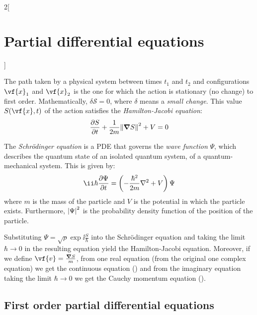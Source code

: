 \documentclass[../../../main_math.tex]{subfiles}
\begin{document}
\begin{multicols}{2}[\section{Partial differential equations}]
  \begin{proposition}
    The path taken by a physical system between times $t_1$ and $t_2$ and configurations $\vf{x}_1$ and $\vf{x}_2$ is the one for which the action is stationary (no change) to first order. Mathematically, $\delta \mathcal{S}=0$, where $\delta$ means a \emph{small change}. This value $S(\vf{x},t)$ of the action satisfies the \emph{Hamilton-Jacobi equation}: $$\pdv{S}{t}+\frac{1}{2m}{\norm{\grad S}}^2+V=0$$
  \end{proposition}
  \begin{proposition}
    The \emph{Schrödinger equation} is a PDE that governs the \emph{wave function} $\Psi$, which describes the quantum state of an isolated quantum system, of a quantum-mechanical system. This is given by: $$\ii \hbar\pdv{\Psi}{t}=\left(-\frac{\hbar^2}{2m}\laplacian+V\right){\Psi}$$ where $m$ is the mass of the particle and $V$ is the potential in which the particle exists. Furthermore, $\abs{\Psi}^2$ is the probability density function of the position of the particle.
  \end{proposition}
  \begin{proposition}
    Substituting ${\Psi}=\sqrt{\rho}\exp{\ii \frac{S}{\hbar}}$ into the Schrödinger equation and taking the limit $\hbar\to 0$ in the resulting equation yield the Hamilton-Jacobi equation. Moreover, if we define $\vf{v}=\frac{\grad{S}}{m}$, from one real equation (from the original one complex equation) we get the continuous equation () and from the imaginary equation taking the limit $\hbar\to 0$ we get the Cauchy momentum equation ().
  \end{proposition}
  \subsection{First order partial differential equations}

\end{multicols}
\end{document}
